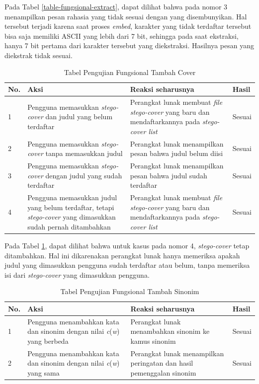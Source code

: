 Pada Tabel \ref{table-fungsional-extract}, dapat dilihat bahwa pada nomor 3 menampilkan pesan rahasia yang tidak sesuai dengan yang disembunyikan. Hal tersebut terjadi karena saat proses \textit{embed}, karakter yang tidak terdaftar tersebut bisa saja memiliki ASCII yang lebih dari 7 bit, sehingga pada saat ekstraksi, hanya 7 bit pertama dari karakter tersebut yang diekstraksi. Hasilnya pesan yang diekstrak tidak sesuai. 

\begin{table}[H]
\label{table-fungsional-tambah-cover}
\centering
\caption{Tabel Pengujian Fungsional Tambah Cover}
\begin{tabular}{|p{0.3cm} | p{4.5cm} | p{7cm} | p{2.5cm} |}\hline
No. & Aksi & Reaksi seharusnya & Hasil\\
\hline
1 & Pengguna memasukkan \textit{stego-cover} dan judul yang belum terdaftar & Perangkat lunak membuat \textit{file stego-cover} yang baru dan mendaftarkannya pada \textit{stego-cover list} & Sesuai\\
\hline
2 & Pengguna memasukkan \textit{stego-cover} tanpa memasukkan judul & Perangkat lunak menampilkan pesan bahwa judul belum diisi & Sesuai \\
\hline
3 & Pengguna memasukkan \textit{stego-cover} dengan judul yang sudah terdaftar & Perangkat lunak menampilkan pesan bahwa judul sudah terdaftar & Sesuai \\
\hline
4 & Pengguna memasukkan judul yang belum terdaftar, tetapi \textit{stego-cover} yang dimasukkan sudah pernah ditambahkan & Perangkat lunak membuat \textit{file stego-cover} yang baru dan mendaftarkannya pada \textit{stego-cover list} & Sesuai \\
\hline
\end{tabular}
\end{table}

Pada Tabel \ref{table-fungsional-tambah-cover}, dapat dilihat bahwa untuk kasus pada nomor 4, \textit{stego-cover} tetap ditambahkan. Hal ini dikarenakan perangkat lunak hanya memeriksa apakah judul yang dimasukkan pengguna sudah terdaftar atau belum, tanpa memeriksa isi dari \textit{stego-cover} yang dimasukkan pengguna.

\begin{table}[H]
\label{table-fungsional-tambah-sinonim}
\centering
\caption{Tabel Pengujian Fungsional Tambah Sinonim}
\begin{tabular}{|p{0.3cm} | p{4.5cm} | p{7cm} | p{2.5cm} |}\hline
No. & Aksi & Reaksi seharusnya & Hasil \\
\hline
1 & Pengguna menambahkan kata dan sinonim dengan nilai \textit{c}(\textit{w}) yang berbeda & Perangkat lunak menambahkan sinonim ke kamus sinonim & Sesuai \\
\hline
2 & Pengguna menambahkan kata dan sinonim dengan nilai \textit{c}(\textit{w}) yang sama & Perangkat lunak menampilkan peringatan dan hasil pemenggalan sinonim & Sesuai \\
\hline
\end{tabular}
\end{table}


